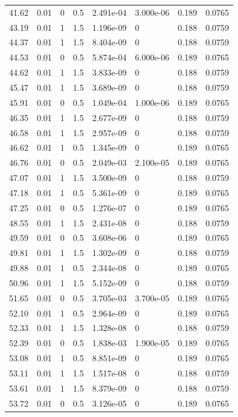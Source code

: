 \documentclass[preview]{standalone}
\begin{document}
{{{\begin{tabular}{L{1.2cm}C{1.2cm} C{0.3cm}C{0.5cm} C{1.4cm}C{1.4cm} C{1.4cm}C{1.4cm}}
  41.62  &  0.01  & 0     & 0.5 &  2.491e-04  & 3.000e-06  & 0.189 &  0.0765   \\ 
  43.19  &  0.01  & 1     & 1.5 &  1.196e-09  & 0  & 0.188 &  0.0759   \\ 
  44.37  &  0.01  & 1     & 1.5 &  8.404e-09  & 0  & 0.188 &  0.0759   \\ 
  44.53  &  0.01  & 0     & 0.5 &  5.874e-04  & 6.000e-06  & 0.189 &  0.0765   \\ 
  44.62  &  0.01  & 1     & 1.5 &  3.833e-09  & 0  & 0.188 &  0.0759   \\ 
  45.47  &  0.01  & 1     & 1.5 &  3.689e-09  & 0  & 0.188 &  0.0759   \\ 
  45.91  &  0.01  & 0     & 0.5 &  1.049e-04  & 1.000e-06  & 0.189 &  0.0765   \\ 
  46.35  &  0.01  & 1     & 1.5 &  2.677e-09  & 0  & 0.188 &  0.0759   \\ 
  46.58  &  0.01  & 1     & 1.5 &  2.957e-09  & 0  & 0.188 &  0.0759   \\ 
  46.62  &  0.01  & 1     & 0.5 &  1.345e-09  & 0  & 0.189 &  0.0765   \\ 
  46.76  &  0.01  & 0     & 0.5 &  2.049e-03  & 2.100e-05  & 0.189 &  0.0765   \\ 
  47.07  &  0.01  & 1     & 1.5 &  3.500e-09  & 0  & 0.188 &  0.0759   \\ 
  47.18  &  0.01  & 1     & 0.5 &  5.361e-09  & 0  & 0.189 &  0.0765   \\ 
  47.25  &  0.01  & 0     & 0.5 &  1.276e-07  & 0  & 0.189 &  0.0765   \\ 
  48.55  &  0.01  & 1     & 1.5 &  2.431e-08  & 0  & 0.188 &  0.0759   \\ 
  49.59  &  0.01  & 0     & 0.5 &  3.608e-06  & 0  & 0.189 &  0.0765   \\ 
  49.81  &  0.01  & 1     & 1.5 &  1.302e-09  & 0  & 0.188 &  0.0759   \\ 
  49.88  &  0.01  & 1     & 0.5 &  2.344e-08  & 0  & 0.189 &  0.0765   \\ 
  50.96  &  0.01  & 1     & 1.5 &  5.152e-09  & 0  & 0.188 &  0.0759   \\ 
  51.65  &  0.01  & 0     & 0.5 &  3.705e-03  & 3.700e-05  & 0.189 &  0.0765   \\ 
  52.10  &  0.01  & 1     & 0.5 &  2.964e-09  & 0  & 0.189 &  0.0765   \\ 
  52.33  &  0.01  & 1     & 1.5 &  1.328e-08  & 0  & 0.188 &  0.0759   \\ 
  52.39  &  0.01  & 0     & 0.5 &  1.838e-03  & 1.900e-05  & 0.189 &  0.0765   \\ 
  53.08  &  0.01  & 1     & 0.5 &  8.851e-09  & 0  & 0.189 &  0.0765   \\ 
  53.11  &  0.01  & 1     & 1.5 &  1.517e-08  & 0  & 0.188 &  0.0759   \\ 
  53.61  &  0.01  & 1     & 1.5 &  8.379e-09  & 0  & 0.188 &  0.0759   \\ 
  53.72  &  0.01  & 0     & 0.5 &  3.126e-05  & 0  & 0.189 &  0.0765   \\ 
\hline 
\end{tabular} 

}}}
\end{document}
